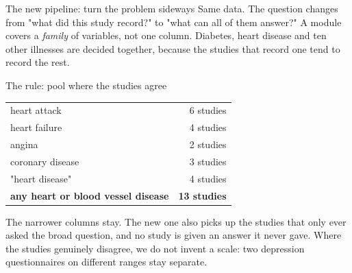 \documentclass[11pt, t, handout]{beamer}
\newcommand{\ans}[1]{\textcolor{structure.fg}{#1}}
\begin{document}
\begin{frame}{The new pipeline: turn the problem sideways}
  \vspace{2pt}
  \centering
  \vspace{8pt}
  \pause
  {\footnotesize Same data. The question changes from "what did this study
   record?" to \ans{"what can all of them answer?"}}
  \vspace{5pt}
  \pause
  {\footnotesize A module covers a \emph{family} of variables, not one column.
   Diabetes, heart disease and ten other illnesses are decided together, because
   the studies that record one tend to record the rest.}
\end{frame}

\begin{frame}{The rule: pool where the studies agree}
  \pause
  \begin{center}\footnotesize
  \begin{tabular}{lr}
    \toprule
    heart attack & 6 studies \\
    heart failure & 4 studies \\
    angina & 2 studies \\
    coronary disease & 3 studies \\
    "heart disease" & 4 studies \\
    \midrule
    \textbf{any heart or blood vessel disease} & \ans{\textbf{13 studies}} \\
    \bottomrule
  \end{tabular}
  \end{center}
  \vspace{10pt}
  \pause
  The narrower columns stay. The new one also picks up the studies that only
  ever asked the broad question, and no study is given an answer it never gave.
  \vspace{6pt}
  \pause
  {\footnotesize Where the studies genuinely disagree, we do not invent a scale:
   two depression questionnaires on different ranges stay separate.}
\end{frame}
\end{document}
